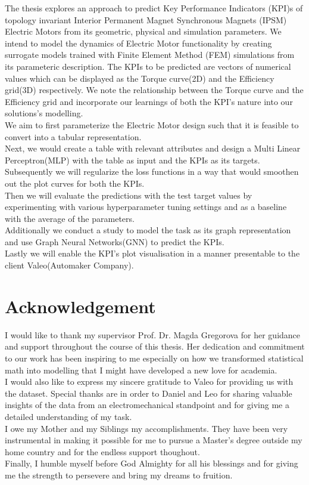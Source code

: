 \documentclass{report} %
\begin{document}
The thesis explores an approach to predict Key Performance Indicators (KPI)s of topology invariant Interior Permanent Magnet Synchronous Magnets 
(IPSM) Electric Motors from its geometric, physical and simulation parameters.
We intend to model the dynamics of Electric Motor functionality by creating surrogate models trained with Finite Element Method (FEM) 
simulations from its parameteric description.
The KPIs to be predicted are vectors of numerical values which can be displayed as the Torque curve(2D) and the Efficiency grid(3D) respectively.
We note the relationship between the Torque curve and the Efficiency grid and incorporate our learnings of both the KPI's nature into our solutions's modelling. \\
We aim to first parameterize the Electric Motor design such that it is feasible to convert into a tabular representation. \\
Next, we would create a table with relevant attributes and design a Multi Linear Perceptron(MLP) with the table as input and the KPIs as its targets.\\
Subsequently we will regularize the loss functions in a way that would smoothen out the plot curves for both the KPIs. \\
Then we will evaluate the predictions with the test target values by experimenting with various hyperparameter tuning settings 
and as a baseline with the average of the parameters.\\
Additionally we conduct a study to model the task as its graph representation and use Graph Neural Networks(GNN) to predict the KPIs.\\
Lastly we will enable the KPI's plot visualisation in a manner presentable to the client Valeo(Automaker Company).\\

\newpage 

\newpage 

\chapter*{Acknowledgement}
I would like to thank my supervisor Prof. Dr. Magda Gregorova for her guidance and support throughout the course of this thesis.
Her dedication and commitment to our work has been inspiring to me especially on how we transformed statistical math into modelling that I might have developed a new love for academia. \\
I would also like to express my sincere gratitude to Valeo for providing us with the dataset.
Special thanks are in order to Daniel and Leo for sharing valuable insights of the data from an electromechanical standpoint and for giving me a detailed understanding of my task. \\
I owe my Mother and my Siblings my accomplishments. They have been very instrumental in making it possible for me to pursue a Master's degree outside my home country and for the endless support thoughout.\\
Finally, I humble myself before God Almighty for all his blessings and for giving me the strength to persevere and bring my dreams to fruition.\\
\end{document}
